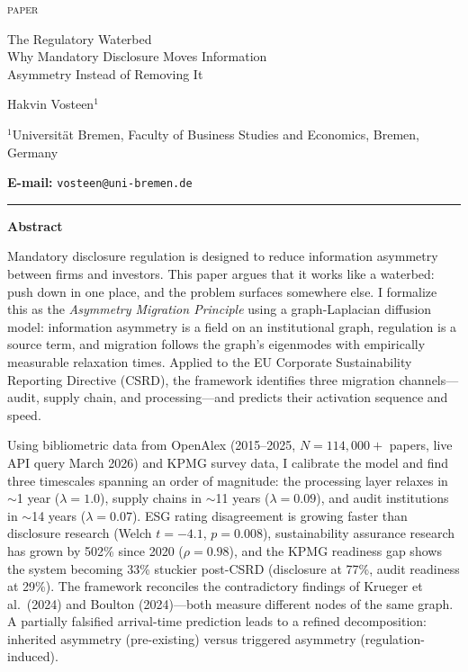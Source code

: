 \documentclass[12pt,a4paper]{article}
\newcommand{\email}[1]{\texttt{#1}}
\begin{document}
{\small\scshape paper}

\vspace{0.8cm}

{\LARGE The Regulatory Waterbed\\[4pt]
Why Mandatory Disclosure Moves Information\\[4pt]
Asymmetry Instead of Removing It}

\vspace{0.7cm}

Hakvin Vosteen$^{1}$

\vspace{0.3cm}

{\small $^1$Universit\"at Bremen, Faculty of Business Studies and Economics, Bremen, Germany}

\vspace{0.3cm}

{\small \textbf{E-mail:} \email{vosteen@uni-bremen.de}}

\vspace{0.6cm}

\noindent\rule{\textwidth}{0.4pt}

\textbf{Abstract}

\vspace{0.2em}

Mandatory disclosure regulation is designed to reduce information asymmetry between firms and investors. This paper argues that it works like a waterbed: push down in one place, and the problem surfaces somewhere else. I formalize this as the \textit{Asymmetry Migration Principle} using a graph-Laplacian diffusion model: information asymmetry is a field on an institutional graph, regulation is a source term, and migration follows the graph's eigenmodes with empirically measurable relaxation times. Applied to the EU Corporate Sustainability Reporting Directive (CSRD), the framework identifies three migration channels---audit, supply chain, and processing---and predicts their activation sequence and speed.

Using bibliometric data from OpenAlex (2015--2025, $N = 114{,}000+$ papers, live API query March 2026) and KPMG survey data, I calibrate the model and find three timescales spanning an order of magnitude: the processing layer relaxes in $\sim$1 year ($\lambda = 1.0$), supply chains in $\sim$11 years ($\lambda = 0.09$), and audit institutions in $\sim$14 years ($\lambda = 0.07$). ESG rating disagreement is growing faster than disclosure research (Welch $t = -4.1$, $p = 0.008$), sustainability assurance research has grown by 502\% since 2020 ($\rho = 0.98$), and the KPMG readiness gap shows the system becoming 33\% stuckier post-CSRD (disclosure at 77\%, audit readiness at 29\%). The framework reconciles the contradictory findings of Krueger et al.\ (2024) and Boulton (2024)---both measure different nodes of the same graph. A partially falsified arrival-time prediction leads to a refined decomposition: inherited asymmetry (pre-existing) versus triggered asymmetry (regulation-induced).
\end{document}
